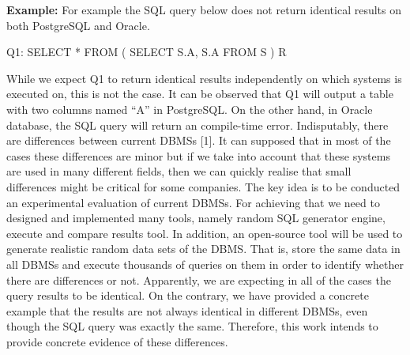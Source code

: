 \textbf{Example:}
For example the SQL query below does not return identical results on both PostgreSQL and Oracle.   

Q1: SELECT * 
          FROM ( SELECT S.A, S.A FROM S ) R


While we expect Q1 to return identical results independently on which systems is executed on, this is not the case. It can be observed that Q1 will output a table with two columns named “A” in PostgreSQL. On the other hand, in Oracle database, the SQL query will return an compile-time error. Ιndisputably, there are differences between current DBMSs [1]. 
It can supposed that in most of the cases these differences are minor but if we take into account that these systems are used in many different fields, then we can quickly realise that small differences might be critical for some companies. The key idea is to be conducted an experimental evaluation of current DBMSs. For achieving that we need to designed and implemented many tools, namely random SQL generator engine, execute and compare results tool. In addition, an open-source tool will be used to generate realistic random data sets of the DBMS. That is, store the same data in all DBMSs and execute thousands of queries on them in order to identify whether there are differences or not. Apparently, we are expecting in all of the cases the query results to be identical. On the contrary, we have provided a concrete example that the results are not always identical in different DBMSs, even though the SQL query was exactly the same. Therefore, this work intends to provide concrete evidence of these differences.





 